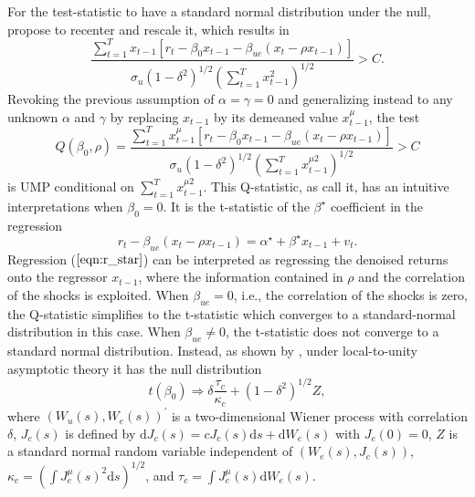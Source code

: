 \documentclass[11pt, a4paper]{article}
\begin{document}
For the test-statistic to have a standard normal distribution under the null, \citet{campbell2006efficient} propose to recenter and rescale it, which results in 
\begin{equation}
\frac{\sum_{t=1}^{T} x_{t-1}\left[r_{t}-\beta_{0} x_{t-1}-\beta_{u e}\left(x_{t}-\rho x_{t-1}\right)\right]}{\sigma_{u}\left(1-\delta^{2}\right)^{1 / 2}\left(\sum_{t=1}^{T} x_{t-1}^{2}\right)^{1 / 2}}>C.
\end{equation}
Revoking the previous assumption of $\alpha=\gamma=0$ and generalizing instead to any unknown  $\alpha$ and $\gamma$ by replacing $x_{t-1}$ by its demeaned value $x_{t-1}^{\mu}$, the test
\begin{equation}
Q\left(\beta_{0}, \rho\right)=\frac{\sum_{t=1}^{T} x_{t-1}^{\mu}\left[r_{t}-\beta_{0} x_{t-1}-\beta_{u e}\left(x_{t}-\rho x_{t-1}\right)\right]}{\sigma_{u}\left(1-\delta^{2}\right)^{1 / 2}\left(\sum_{t=1}^{T} x_{t-1}^{\mu 2}\right)^{1 / 2}}>C
\end{equation}
is UMP conditional on $\sum_{t=1}^{T} x_{t-1}^{\mu 2}$.
This Q-statistic, as \citet{campbell2006efficient} call it, has an intuitive interpretations when $\beta_{0} = 0$. It is the t-statistic of the $\beta^{\star}$ coefficient in the regression
 \begin{equation}
 \label{eqn:r_star}
r_{t}-\beta_{u e}\left(x_{t}-\rho x_{t-1}\right)=\alpha^{\star}+\beta^{\star} x_{t-1}+v_{t}. 
\end{equation}
Regression ($\ref{eqn:r_star}$) can be interpreted as regressing the denoised returns onto the regressor $x_{t-1}$, where the information contained in $\rho$ and the correlation of the shocks is exploited.
When $\beta_{u e}=0$, i.e., the correlation of the shocks is zero, the Q-statistic simplifies to the t-statistic which converges to a standard-normal distribution in this case. When $\beta_{u e}\neq0$, the t-statistic does not converge to a standard normal distribution. Instead, as shown by \citet{elliott1994inference}, under local-to-unity asymptotic theory it has the null distribution 
\begin{equation}
\label{lua_t}
t\left(\beta_{0}\right) \Rightarrow \delta \frac{\tau_{c}}{\kappa_{c}}+\left(1-\delta^{2}\right)^{1 / 2} Z,
\end{equation}
where $\left(W_{u}(s), W_{e}(s)\right)^{\prime}$ is a two-dimensional Wiener process with correlation $\delta$, $J_{c}(s)$ is defined by $\mathrm{d} J_{c}(s)=c J_{c}(s) \mathrm{d} s+\mathrm{d} W_{e}(s)$ with $J_{c}(0)=0$, $Z$ is a standard normal random variable independent of $\left(W_{e}(s), J_{c}(s)\right)$, $\kappa_{c}=\left(\int J_{c}^{\mu}(s)^{2} \mathrm{d} s\right)^{1 / 2}$, and $\tau_{c}=\int J_{c}^{\mu}(s) \mathrm{d} W_{e}(s)$.
\end{document}
